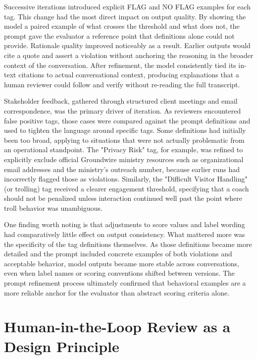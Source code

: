 \documentclass[12pt]{article}
\begin{document}
		Successive iterations introduced explicit FLAG and NO FLAG examples for each tag. This change had the most direct impact on output quality. By showing the model a paired example of what crosses the threshold and what does not, the prompt gave the evaluator a reference point that definitions alone could not provide. Rationale quality improved noticeably as a result. Earlier outputs would cite a quote and assert a violation without anchoring the reasoning in the broader context of the conversation. After refinement, the model consistently tied its in-text citations to actual conversational context, producing explanations that a human reviewer could follow and verify without re-reading the full transcript.

	Stakeholder feedback, gathered through structured client meetings and email correspondence, was the primary driver of iteration. As reviewers encountered false positive tags, those cases were compared against the prompt definitions and used to tighten the language around specific tags. Some definitions had initially been too broad, applying to situations that were not actually problematic from an operational standpoint. The "Privacy Risk" tag, for example, was refined to explicitly exclude official Groundwire ministry resources such as organizational email addresses and the ministry's outreach number, because earlier runs had incorrectly flagged those as violations. Similarly, the "Difficult Visitor Handling" (or trolling) tag received a clearer engagement threshold, specifying that a coach should not be penalized unless interaction continued well past the point where troll behavior was unambiguous.

	One finding worth noting is that adjustments to score values and label wording had comparatively little effect on output consistency. What mattered more was the specificity of the tag definitions themselves. As those definitions became more detailed and the prompt included concrete examples of both violations and acceptable behavior, model outputs became more stable across conversations, even when label names or scoring conventions shifted between versions. The prompt refinement process ultimately confirmed that behavioral examples are a more reliable anchor for the evaluator than abstract scoring criteria alone.

	\section{Human-in-the-Loop Review as a Design Principle}
	
\end{document}
